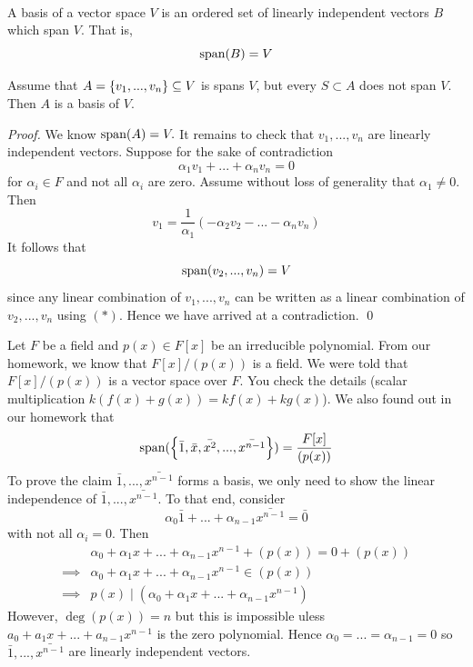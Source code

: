 \begin{definition}[Basis] \leavevmode \\
    A basis of a vector space $V$ is an ordered set of linearly independent vectors $B$ which span $V$. That is,
    $$\text{span}(B) = V$$
\end{definition}

\begin{proposition}
    Assume that $A = \left\{v_1,...,v_n\right\}\subseteq V$ is spans $V$, but every $S \subset A$ does not span $V$. Then $A$ is a basis of $V$.
\end{proposition}

\begin{proof}
    We know $\text{span}(A) = V.$ It remains to check that $v_1,...,v_n$ are linearly independent vectors. Suppose for the sake of contradiction
    $$\alpha_1v_1 + ... + \alpha_n v_n = 0$$
    for $\alpha_i \in F$ and not all $\alpha_i$ are zero. Assume without loss of generality that $\alpha_1 \neq 0$. Then
    \begin{equation*}
        v_1 = \dfrac{1}{\alpha_1}(-\alpha_2v_2-...-\alpha_nv_n)
        \tag{$*$}
    \end{equation*}
    It follows that 
    $$\text{span}(v_2, ..., v_n) = V$$
    since any linear combination of $v_1, ..., v_n$ can be written as a linear combination of $v_2,...,v_n$ using $(*)$. Hence we have arrived at a contradiction.
    \qed
\end{proof}

\begin{example}
    Let $F$ be a field and $p(x) \in F[x]$ be an irreducible polynomial. From our homework, we know that $F[x]/(p(x))$ is a field. We were told that $F[x]/(p(x))$ is a vector space over $F$. You check the details (scalar multiplication $k(f(x) + g(x)) = kf(x) + kg(x)$). We also found out in our homework that 
    $$\text{span}(\left\{\bar{1}, \bar{x}, \bar{x^2}, ..., \bar{x^{n-1}}\right\})= \dfrac{F[x]}{(p(x))}$$
    To prove the claim $\bar{1}, ..., \bar{x^{n-1}}$ forms a basis, we only need to show the linear independence of $\bar{1}, ..., \bar{x^{n-1}}$. To that end, consider
    $$\alpha_0\bar{1}+...+\alpha_{n-1} \bar{x^{n-1}} = \bar{0}$$
    with not all $\alpha_i = 0$. Then
    \begin{align*}
        &\alpha_0 + \alpha_1 x + ... + \alpha_{n-1}x^{n-1} + (p(x)) = 0 + (p(x)) \\ 
        \implies &\alpha_0 + \alpha_1 x + ... + \alpha_{n-1}x^{n-1} \in (p(x)) \\
        \implies &p(x) \mid (\alpha_0 + \alpha_1 x +...+ \alpha_{n-1}x^{n-1})
    \end{align*}
    However, $\deg(p(x)) = n$ but this is impossible uless $a_0 + a_1x + ... + a_{n-1}x^{n-1}$ is the zero polynomial. Hence $\alpha_0 = ... = \alpha_{n-1} = 0$ so $\bar{1}, ..., \bar{x^{n-1}}$ are linearly independent vectors.
\end{example}

